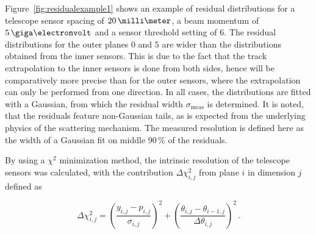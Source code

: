 Figure~\ref{fig:residualexample1} shows an example of residual distributions for a telescope sensor spacing of $20\,\milli\meter$,
 a beam momentum of $5\,\giga\electronvolt$ and a sensor threshold setting of $6$.
The residual distributions for the outer planes $0$ and $5$ are wider than the distributions obtained from the inner sensors.
This is due to the fact that the track extrapolation to the inner sensors is done from both sides, hence will be comparatively more precise than for the outer sensors,
 where the extrapolation can only be performed from one direction. 
In all cases, the distributions are fitted with a Gaussian, from which the residual width $\sigma_{\textrm{meas}}$ is determined.
It is noted, that the residuals feature non-Gaussian tails, as is expected from the underlying physics of the scattering mechanism. 
The measured resolution is defined here as the width of a Gaussian fit on middle 90\,\% of the residuals. 



% 

By using a $\chi^{2}$ minimization method, the intrinsic resolution of the \Mimosa telescope sensors was calculated, with the contribution $\Delta \chi^2_{i,j}$ from plane $i$ in dimension $j$ defined as

\begin{equation}
\Delta \chi^2_{i,j} = \left( \frac{y_{i,j} - p_{i,j}}{\sigma_{i,j}} \right)^2 +
\left( \frac{\theta_{i,j} - \theta_{i-1,j}}{\Delta \theta_{i,j}} \right)^2 \,.
\end{equation}

